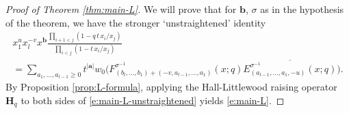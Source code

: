 \documentclass[12pt]{amsart}
\theoremstyle{definition}
\theoremstyle{remark}
\newcommand{\aA}{{\mathbf a}}
\newcommand{\bb}{{\mathbf b}}
\newcommand{\Hbold}{{\mathbf H}}
\begin{document}
\begin{proof}[Proof of Theorem \ref{thm:main-L}]
We will prove that for $\bb $, $\sigma $ as in the hypothesis of the
theorem, we have the stronger `unstraightened' identity
\begin{multline}\label{e:main-L-unstraightened}
x_{1}^{u}x_{l}^{-v}x^{\bb }\frac{\prod _{i+1<j}(1 -
q\, t\, x_{i}/x_{j})}{\prod _{i<j}(1 - t\, x_{i}/x_{j})}\\
 = \sum _{a_{1},\ldots,a_{l-1}\geq 0} t^{|\aA |} w_{0} \bigl(F^{\sigma ^{-1}
}_{(b_{l},\ldots,b_{1})+(-v,a_{l-1},\ldots,a_{1})}(x;q)
\overline{E^{\sigma ^{-1}}_{(a_{l-1},\ldots,a_{1},-u)}(x;q)} \bigr).
\end{multline}
By Proposition \ref{prop:L-formula}, applying the Hall-Littlewood
raising operator $\Hbold _{q}$ to both sides of
\eqref{e:main-L-unstraightened} yields \eqref{e:main-L}.


\end{proof}
\end{document}
